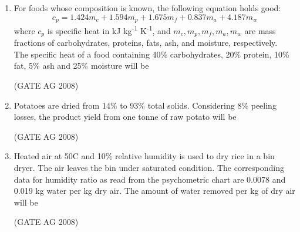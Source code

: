 \documentclass[journal,12pt,onecolumn]{IEEEtran}
\begin{document}
\begin{enumerate}
\medskip

\item 
 For foods whose composition is known, the following equation holds good:
\[
c_p = 1.424 m_c + 1.594 m_p + 1.675 m_f + 0.837 m_a + 4.187 m_w
\]
where $c_p$ is specific heat in kJ kg\textsuperscript{-1} K\textsuperscript{-1}, and $m_c, m_p, m_f, m_a, m_w$ are mass fractions of carbohydrates, proteins, fats, ash, and moisture, respectively. \\
The specific heat of a food containing 40\% carbohydrates, 20\% protein, 10\% fat, 5\% ash and 25\% moisture will be
\begin{enumerate}
\end{enumerate}
\hfill(GATE AG 2008)\\

\medskip

\item 
 Potatoes are dried from 14\% to 93\% total solids. Considering 8\% peeling losses, the product yield from one tonne of raw potato will be
\begin{enumerate}
\end{enumerate}
\hfill(GATE AG 2008)\\

\medskip

\item 
 Heated air at 50\textdegree C and 10\% relative humidity is used to dry rice in a bin dryer. The air leaves the bin under saturated condition. The corresponding data for humidity ratio as read from the psychometric chart are 0.0078 and 0.019 kg water per kg dry air. The amount of water removed per kg of dry air will be
\begin{enumerate}
\end{enumerate}
\hfill(GATE AG 2008)\\


\end{enumerate}
\end{document}
